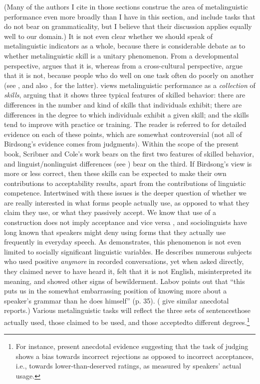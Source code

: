 (Many of the authors I cite in those sections construe the area of metalinguistic performance even more broadly than I have in this section, and include tasks that do not bear on grammaticality, but I believe that their discussion applies equally well to our domain.) It is not even clear whether we should speak of metalinguistic indicators as a whole, because there is considerable debate as to whether metalinguistic skill is a unitary phenomenon. From a developmental perspective, \citet{Hakes1980} argues that it is, whereas from a cross-cultural perspective, \citet{ScribnerEtAl1981} argue that it is not, because people who do well on one task often do poorly on another (see , and also , for the latter). \citet{Birdsong1989} views metalinguistic performance as a \textit{collection} of \textit{skills}, arguing that it shows three typical features of skilled behavior: there are differences in the number and kind of skills that individuals exhibit; there are differences in the degree to which individuals exhibit a given skill; and the skills tend to improve with practice or training. The reader is referred to \citet[51\textendash{}54]{Birdsong1989} for detailed evidence on each of these points, which are somewhat controversial (not all of Birdsong's evidence comes from judgments). Within the scope of the present book, Scribner and Cole's work bears on the first two features of skilled behavior, and linguist/nonlinguist differences (see ) bear on the third. If Birdsong's view is more or less correct, then these skills can be expected to make their own contributions to acceptability results, apart from the contributions of linguistic competence. Intertwined with these issues is the deeper question of whether we are really interested in what forms people actually use, as opposed to what they claim they use, or what they passively accept. We know that use of a construction does not imply acceptance and vice versa \citep{Greenbaum1976a}, and sociolinguists have long known that speakers might deny using forms that they actually use frequently in everyday speech. As \citet{Labov1975} demonstrates, this phenomenon is not even limited to socially significant linguistic variables. He describes numerous subjects who used positive \textit{anymore} in recorded conversations, yet when asked directly, they claimed never to have heard it, felt that it is not English, misinterpreted its meaning, and showed other signs of bewilderment. Labov points out that ``this puts us in the somewhat embarrassing position of knowing more about a speaker's grammar than he does himself'' (p. 35). (\citet{HindleEtAl1975} give similar anecdotal reports.) Various metalinguistic tasks will reflect the three sets of sentences\schdash{}those actually used, those claimed to be used, and those accepted\schdash{}to different degrees.\footnote{For instance, \citet{HindleEtAl1975} present anecdotal evidence suggesting that the task of judging shows a bias towards incorrect rejections as opposed to incorrect acceptances, i.e., towards lower-than-deserved ratings, as measured by speakers' actual usage.}
